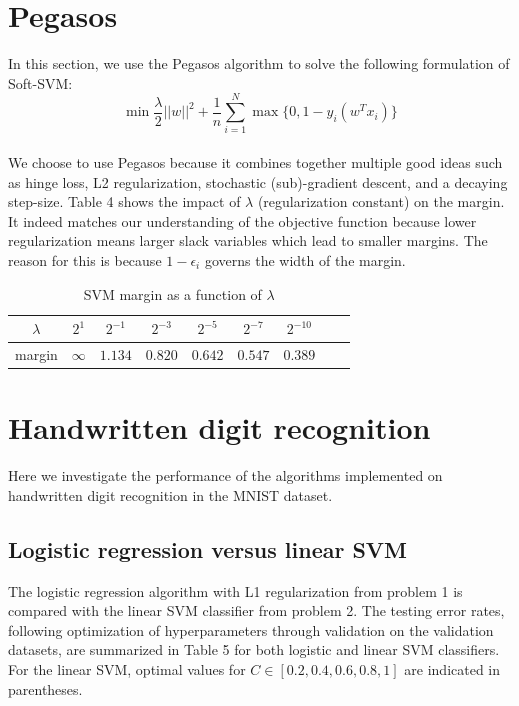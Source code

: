 \documentclass{article}
\begin{document}
\section{Pegasos}

In this section, we use the Pegasos algorithm to solve the following formulation of Soft-SVM: \\
$$\min \frac{\lambda}{2} ||w||^2 + \frac{1}{n} \sum_{i=1}^{N}  \max \{0,1 - y_i(w^T x_i)\}$$\\
We choose to use Pegasos because it combines together multiple good ideas such as hinge loss, L2 regularization, stochastic (sub)-gradient descent, and a decaying step-size. Table 4 shows the impact of $\lambda$ (regularization constant) on the margin. It indeed matches our understanding of the objective function because lower regularization means larger slack variables which lead to smaller margins. The reason for this is because $1-\epsilon_i$ governs the width of the margin.

\begin{table}
  \begin{center}
    \begin{tabular}{ | c | c | c | c | c | c | c | c | c |}
      \hline
       $\lambda$& $2^1$       & $2^{-1}$&  $2^{-3}$& $2^{-5}$&  $2^{-7}$&  $2^{-10}$ \\ \hline
       margin       & $\infty$     & $1.134$&   $0.820$& $0.642$&  $0.547$&   $0.389$  \\ \hline

    \end{tabular}
  \end{center}
  \caption{SVM margin as a function of $\lambda$}
\end{table}

\section{Handwritten digit recognition}
Here we investigate the performance of the algorithms implemented on handwritten digit recognition in the MNIST dataset.

\subsection{Logistic regression versus linear SVM}

The logistic regression algorithm with L1 regularization from problem 1 is compared with the linear SVM classifier from problem 2. The testing error rates, following optimization of hyperparameters through validation on the validation datasets, are summarized in Table 5 for both logistic and linear SVM classifiers. For the linear SVM, optimal values for $C \in [0.2, 0.4, 0.6, 0.8, 1]$ are indicated in parentheses. \\
\end{document}
